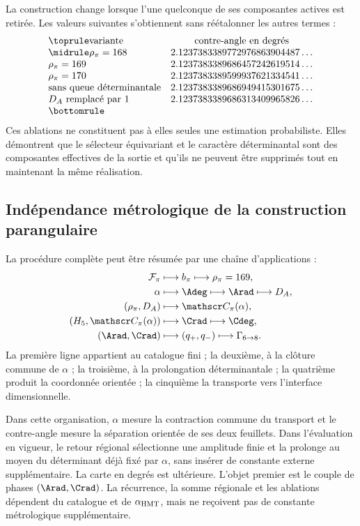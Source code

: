 La construction change lorsque l'une quelconque de ses composantes actives est retirée.
Les valeurs suivantes s'obtiennent sans réétalonner les autres termes :
\[
\begin{array}{@{}lc@{}}
\toprule
\text{variante}&\text{contre-angle en degrés}\\
\midrule
\rho_\pi=168&2.1237383389772976863904487\ldots\\
\rho_\pi=169&2.1237383389686457242619514\ldots\\
\rho_\pi=170&2.1237383389599937621334541\ldots\\
\text{sans queue déterminantale}&2.1237383389686949415301675\ldots\\
D_A\text{ remplacé par }1&2.1237383389686313409965826\ldots\\
\bottomrule
\end{array}
\]
Ces ablations ne constituent pas à elles seules une estimation probabiliste.
Elles démontrent que le sélecteur équivariant et le caractère déterminantal sont
des composantes effectives de la sortie et qu'ils ne peuvent être supprimés tout en maintenant la
même réalisation.

\subsection{Indépendance métrologique de la construction parangulaire}
\label{sec:s102:c38:7:6}


La procédure complète peut être résumée par une chaîne d'applications :
\[
\begin{aligned}
\mathcal F_\pi
&\longmapsto b_\pi
\longmapsto\rho_\pi=169,\\
\alpha
&\longmapsto \Adeg
\longmapsto \Arad
\longmapsto D_A,\\
(\rho_\pi,D_A)
&\longmapsto\mathscr C_\pi(\alpha),\\
(H_5,\mathscr C_\pi(\alpha))
&\longmapsto \Crad
\longmapsto \Cdeg,\\
(\Arad,\Crad)
&\longmapsto(q_+,q_-)
\longmapsto\Gamma_{6\to8}.
\end{aligned}
\]
La première ligne appartient au catalogue fini ; la deuxième, à la clôture commune de
\(\alpha\) ; la troisième, à la prolongation déterminantale ; la quatrième produit la
coordonnée orientée ; la cinquième la transporte vers l'interface dimensionnelle.

Dans cette organisation, \(\alpha\) mesure la contraction commune du transport et
le contre-angle mesure la séparation orientée de ses deux feuillets. Dans
l'évaluation en vigueur, le retour régional sélectionne une amplitude finie et la
prolonge au moyen du déterminant déjà fixé par \(\alpha\), sans insérer de
constante externe supplémentaire. La carte en degrés est ultérieure. L'objet
premier est le couple de phases \((\Arad,\Crad)\). La récurrence, la somme
régionale et les ablations dépendent du catalogue et de
\(\alpha_{\rm HMT}\), mais ne reçoivent pas de constante métrologique supplémentaire.

